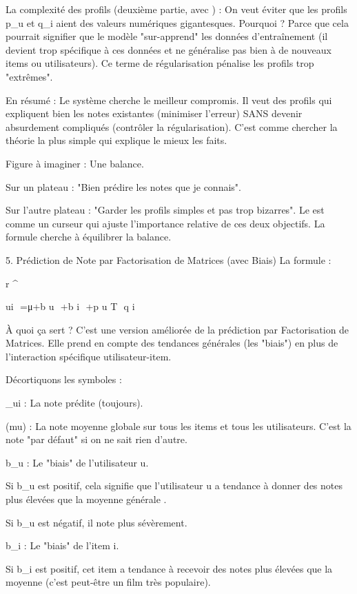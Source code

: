 La complexité des profils (deuxième partie, avec \lambda) : On veut éviter que les profils p_u et q_i aient des valeurs numériques gigantesques. Pourquoi ? Parce que cela pourrait signifier que le modèle "sur-apprend" les données d'entraînement (il devient trop spécifique à ces données et ne généralise pas bien à de nouveaux items ou utilisateurs). Ce terme de régularisation pénalise les profils trop "extrêmes".

En résumé : Le système cherche le meilleur compromis. Il veut des profils qui expliquent bien les notes existantes (minimiser l'erreur) SANS devenir absurdement compliqués (contrôler la régularisation). C'est comme chercher la théorie la plus simple qui explique le mieux les faits.

Figure à imaginer :
Une balance.

Sur un plateau : "Bien prédire les notes que je connais".

Sur l'autre plateau : "Garder les profils simples et pas trop bizarres".
Le \lambda est comme un curseur qui ajuste l'importance relative de ces deux objectifs. La formule cherche à équilibrer la balance.

5. Prédiction de Note par Factorisation de Matrices (avec Biais)
La formule :


r
^
  
ui
​
 =μ+b 
u
​
 +b 
i
​
 +p 
u
T
​
 q 
i
​
 
À quoi ça sert ?
C'est une version améliorée de la prédiction par Factorisation de Matrices. Elle prend en compte des tendances générales (les "biais") en plus de l'interaction spécifique utilisateur-item.

Décortiquons les symboles :

_{ui} : La note prédite (toujours).

\mu (mu) : La note moyenne globale sur tous les items et tous les utilisateurs. C'est la note "par défaut" si on ne sait rien d'autre.

b_u : Le "biais" de l'utilisateur u.

Si b_u est positif, cela signifie que l'utilisateur u a tendance à donner des notes plus élevées que la moyenne générale \mu.

Si b_u est négatif, il note plus sévèrement.

b_i : Le "biais" de l'item i.

Si b_i est positif, cet item a tendance à recevoir des notes plus élevées que la moyenne \mu (c'est peut-être un film très populaire).

